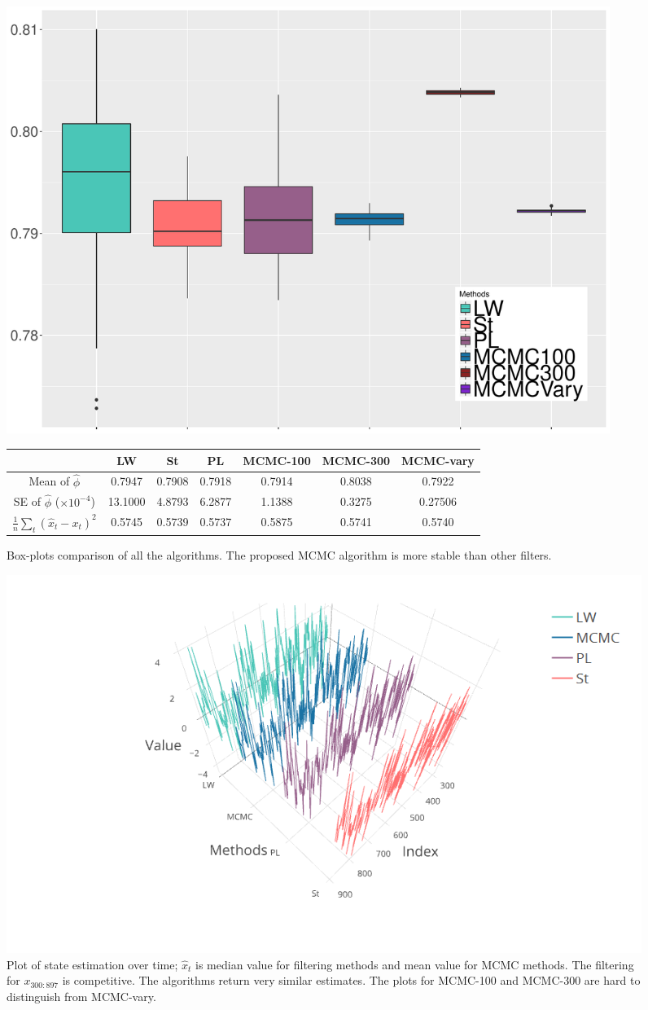  
\begin{figure}[h!]
\centering
\includegraphics[width=0.95\textwidth]{Chapters/04Filtering/plot/CompMCMCboxplotALL.pdf}
\begin{tabular}{|c|c|c|c|c|c|c|}
\hline
     & LW & St & PL  & MCMC-100 & MCMC-300 & MCMC-vary \\ \hline
Mean of $\hat{\phi}$ & 0.7947 &   0.7908   &  0.7918 & 0.7914 &  0.8038& 0.7922 \\ \hline
SE of $\hat{\phi}$ ($\times 10^{-4}$) &  13.1000  & 4.8793 & 6.2877 & 1.1388 & 0.3275 & 0.27506 \\ \hline
$\frac{1}{n}\sum_t(\hat{x}_t-x_t)^2$ & 0.5745 & 0.5739 & 0.5737 & 0.5875&  0.5741 &  0.5740 \\ \hline
\end{tabular}
\caption{Box-plots comparison of all the algorithms. The proposed MCMC algorithm is more stable than other filters.} \label{FilterRiewComparesionTable}
\end{figure}


\begin{figure}[h!]
\centering
\includegraphics[width=\textwidth]{Chapters/04Filtering/plot/plotlyFilterCompX2.png}
\caption{Plot of state estimation over time; $\hat{x}_t$ is median value for filtering methods and mean value for MCMC methods. The filtering for $x_{300:897}$ is competitive. The algorithms return very similar estimates. The plots for MCMC-100 and MCMC-300 are hard to distinguish from MCMC-vary.} \label{FilterRiewComparesion02}
\end{figure}


